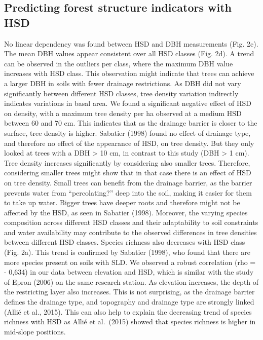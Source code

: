 \documentclass[fleqn,12pt]{latex/stylish_article} %
\begin{document}
\hypertarget{predicting-forest-structure-indicators-with-hsd}{%
\subsection{Predicting forest structure indicators with HSD}\label{predicting-forest-structure-indicators-with-hsd}}

No linear dependency was found between HSD and DBH measurements (Fig. 2c). The mean DBH values appear consistent over all HSD classes (Fig. 2d). A trend can be observed in the outliers per class, where the maximum DBH value increases with HSD class. This observation might indicate that trees can achieve a larger DBH in soils with fewer drainage restrictions.
As DBH did not vary significantly between different HSD classes, tree density variation indirectly indicates variations in basal area. We found a significant negative effect of HSD on density, with a maximum tree density per ha observed at a medium HSD between 60 and 70 cm. This indicates that as the drainage barrier is closer to the surface, tree density is higher. Sabatier (1998) found no effect of drainage type, and therefore no effect of the appearance of HSD, on tree density. But they only looked at trees with a DBH \textgreater{} 10 cm, in contrast to this study (DBH \textgreater{} 1 cm). Tree density increases significantly by considering also smaller trees. Therefore, considering smaller trees might show that in that case there is an effect of HSD on tree density. Small trees can benefit from the drainage barrier, as the barrier prevents water from \enquote{percolating?} deep into the soil, making it easier for them to take up water. Bigger trees have deeper roots and therefore might not be affected by the HSD, as seen in Sabatier (1998). Moreover, the varying species composition across different HSD classes and their adaptability to soil constraints and water availability may contribute to the observed differences in tree densities between different HSD classes.
Species richness also decreases with HSD class (Fig. 2a). This trend is confirmed by Sabatier (1998), who found that there are more species present on soils with SLD.
We observed a robust correlation (rho = - 0,634) in our data between elevation and HSD, which is similar with the study of Epron (2006) on the same research station. As elevation increases, the depth of the restricting layer also increases. This is not surprising, as the drainage barrier defines the drainage type, and topography and drainage type are strongly linked (Allié et al., 2015). This can also help to explain the decreasing trend of species richness with HSD as Allié et al.~(2015) showed that species richness is higher in mid-slope positions.
\end{document}
